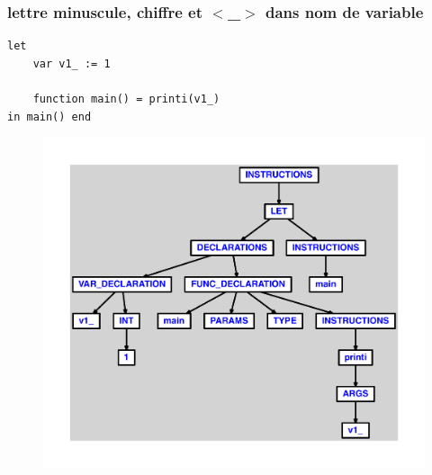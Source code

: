 \documentclass{article}
\begin{document}
\subsubsection{lettre minuscule, chiffre et $ < $\_$ > $ dans nom de variable}
\begin{lstlisting}
let
	var v1_ := 1

	function main() = printi(v1_)
in main() end
\end{lstlisting}
\newpage
\begin{figure}[H]
\centering
\includegraphics[max width=\textwidth]{ast/ast_321.pdf}
\end{figure}
\newpage
\end{document}
